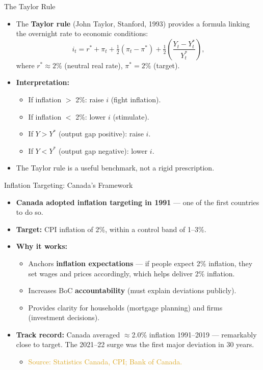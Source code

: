 \documentclass[aspectratio=169]{beamer}
\begin{document}
\begin{frame}{The Taylor Rule}
\transfade
\begin{itemize}
  \item The \textbf{Taylor rule} (John Taylor, Stanford, 1993) provides a formula linking the overnight rate to economic conditions:
  \[
    i_t = r^* + \pi_t + \tfrac{1}{2}(\pi_t - \pi^*) + \tfrac{1}{2}\!\left(\frac{Y_t - Y^*_t}{Y^*_t}\right),
  \]
  where $r^* \approx 2\%$ (neutral real rate), $\pi^* = 2\%$ (target).
  \item \textbf{Interpretation:}
  \begin{itemize}
    \item If inflation $>$ 2\%: raise $i$ (fight inflation).
    \item If inflation $<$ 2\%: lower $i$ (stimulate).
    \item If $Y > Y^*$ (output gap positive): raise $i$.
    \item If $Y < Y^*$ (output gap negative): lower $i$.
  \end{itemize}
  \item The Taylor rule is a useful \alert{benchmark}, not a rigid prescription.
\end{itemize}
\end{frame}

\begin{frame}{Inflation Targeting: Canada's Framework}
\transfade
\begin{itemize}
  \item \textbf{Canada adopted inflation targeting in 1991} --- one of the first countries to do so.
  \item \textbf{Target:} CPI inflation of \alert{2\%}, within a control band of 1--3\%.
  \item \textbf{Why it works:}
  \begin{itemize}
    \item Anchors \textbf{inflation expectations} --- if people expect 2\% inflation, they set wages and prices accordingly, which helps deliver 2\% inflation.
    \item Increases BoC \textbf{accountability} (must explain deviations publicly).
    \item Provides clarity for households (mortgage planning) and firms (investment decisions).
  \end{itemize}
  \item \textbf{Track record:} Canada averaged $\approx$\alert{2.0\%} inflation 1991--2019 --- remarkably close to target. The 2021--22 surge was the first major deviation in 30 years.
  \begin{itemize}
    \item \textcolor{goldenrod}{Source: Statistics Canada, CPI; Bank of Canada.}
  \end{itemize}
\end{itemize}
\end{frame}
\end{document}
